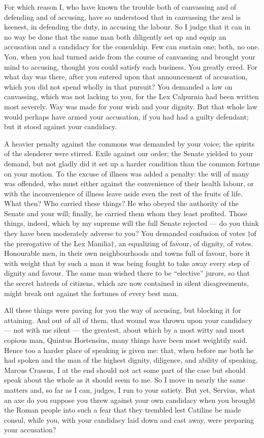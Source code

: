  For which reason I, who have known the trouble both of canvassing and of defending and of accusing, have so understood that in canvassing the zeal is keenest, in defending the duty, in accusing the labour. So I judge that it can in no way be done that the same man both diligently set up and equip an accusation and a candidacy for the consulship. Few can sustain one; both, no one. You, when you had turned aside from the course of canvassing and brought your mind to accusing, thought you could satisfy each business. You greatly erred. For what day was there, after you entered upon that announcement of accusation, which you did not spend wholly in that pursuit? You demanded a law on canvassing, which was not lacking to you, for the Lex Calpurnia had been written most severely. Way was made for your wish and your dignity. But that whole law would perhaps have armed your accusation, if you had had a guilty defendant; but it stood against your candidacy.

 A heavier penalty against the commons was demanded by your voice; the spirits of the slenderer were stirred. Exile against our order; the Senate yielded to your demand, but not gladly did it set up a harder condition than the common fortune on your motion. To the excuse of illness was added a penalty: the will of many was offended, who must either against the convenience of their health labour, or with the inconvenience of illness leave aside even the rest of the fruits of life. What then? Who carried these things? He who obeyed the authority of the Senate and your will; finally, he carried them whom they least profited. Those things, indeed, which by my supreme will the full Senate rejected --- do you think they have been moderately adverse to you? You demanded confusion of votes †of the prerogative of the Lex Manilia†, an equalizing of favour, of dignity, of votes. Honourable men, in their own neighbourhoods and towns full of favour, bore it with weight that by such a man it was being fought to take away every step of dignity and favour. The same man wished there to be ``elective'' jurors, so that the secret hatreds of citizens, which are now contained in silent disagreements, might break out against the fortunes of every best man.

 All these things were paving for you the way of accusing, but blocking it for attaining. And out of all of them, that wound was thrown upon your candidacy --- not with me silent --- the greatest, about which by a most witty and most copious man, Quintus Hortensius, many things have been most weightily said. Hence too a harder place of speaking is given me: that, when before me both he had spoken and the man of the highest dignity, diligence, and ability of speaking, Marcus Crassus, I at the end should not act some part of the case but should speak about the whole as it should seem to me. So I move in nearly the same matters and, so far as I can, judges, I run to your satiety. But yet, Servius, what an axe do you suppose you threw against your own candidacy when you brought the Roman people into such a fear that they trembled lest Catiline be made consul, while you, with your candidacy laid down and cast away, were preparing your accusation?

